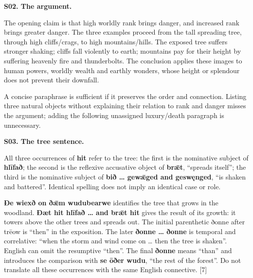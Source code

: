 \par\begin{minipage}{\linewidth}\raggedright
\textbf{S02. The argument.}

The opening claim is that high worldly rank brings danger, and increased rank brings greater danger. The three examples proceed from the tall spreading tree, through high cliffs/\allowbreak{}crags, to high mountains/\allowbreak{}hills. The exposed tree suffers stronger shaking; cliffs fall violently to earth; mountains pay for their height by suffering heavenly fire and thunderbolts. The conclusion applies these images to human powers, worldly wealth and earthly wonders, whose height or splendour does not prevent their downfall.

A concise paraphrase is sufficient if it preserves the order and connection. Listing three natural objects without explaining their relation to rank and danger misses the argument; adding the following unassigned luxury/\allowbreak{}death paragraph is unnecessary.

\end{minipage}\par\addvspace{4pt}

\par\begin{minipage}{\linewidth}\raggedright
\textbf{S03. The tree sentence.}

All three occurrences of \textbf{hit} refer to the tree: the first is the nominative subject of \textbf{hlīfað}; the second is the reflexive accusative object of \textbf{brǣt}, “spreads itself”; the third is the nominative subject of \textbf{bið … gewǣged and geswęnged}, “is shaken and battered”. Identical spelling does not imply an identical case or role.

\textbf{Ðe wiexð on ðǣm wudubearwe} identifies the tree that grows in the woodland. \textbf{Ðæt hit hlīfað … and brǣt hit} gives the result of its growth: it towers above the other trees and spreads out. The initial parenthetic ðonne after trēow is “then” in the exposition. The later \textbf{ðonne … ðonne} is temporal and correlative: “when the storm and wind come on … then the tree is shaken”. English can omit the resumptive “then”. The final \textbf{ðonne} means “than” and introduces the comparison with \textbf{se ōðer wudu}, “the rest of the forest”. Do not translate all these occurrences with the same English connective. [7]

\end{minipage}\par\addvspace{4pt}

